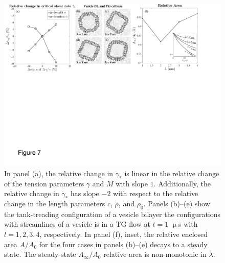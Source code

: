 \documentclass[prb,preprint,showpacs,preprintnumbers,amsmath,amssymb,longbibliography]{revtex4-2}
\begin{document}
\begin{figure}[t]
\begin{center}
  \includegraphics[width=\textwidth]{critical_shear_and_cell_size.pdf}
\end{center}
\caption{\label{fig:PramChange}
In panel (a), the relative change in $\dot \gamma_*$ is linear in the
  relative change of the tension parameters $\gamma$ and $M$ with slope
  $1$. Additionally, the relative change in $\dot \gamma_*$ has slope
  $-2$ with respect to the relative change in the length parameters $c$,
  $\rho$, and $\rho_0$. Panels (b)--(e) show the tank-treading
  configuration of a vesicle bilayer the configurations with streamlines
  of a vesicle is in a TG flow at $t=1$ $\upmu$s with $l= 1,2,3,4$,
  respectively. In panel (f),
  inset, the relative enclosed area $A/A_0$
  for the four cases in panels (b)--(e) decays to a steady state.
  The steady-state $A_{\infty}/A_0$ relative area is non-monotonic
  in $\lambda$.} 
\end{figure}
\end{document}

